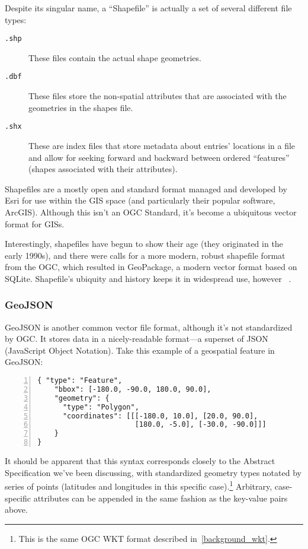 Despite its singular name, a ``Shapefile'' is actually a set of several different file types:

\begin{description}
  \item[\tt{.shp}] These files contain the actual shape geometries.
  \item[\tt{.dbf}] These files store the non-spatial attributes that are associated with the geometries in the shapes file.
  \item[\tt{.shx}] These are index files that store metadata about entries' locations in a file and allow for seeking forward and backward between ordered ``features'' (shapes associated with their attributes).
\end{description}

Shapefiles are a mostly open and standard format managed and developed by Esri for use within the GIS space (and particularly their popular software, ArcGIS). Although this isn't an OGC Standard, it's become a ubiquitous vector format for GISs.

Interestingly, shapefiles have begun to show their age (they originated in the early 1990s), and there were calls for a more modern, robust shapefile format from the OGC, which resulted in GeoPackage, a modern vector format based on SQLite. Shapefile's ubiquity and history keeps it in widespread use, however ~\cite{slashgeo,GeoPackage}.

\subsubsection{GeoJSON}
GeoJSON is another common vector file format, although it's not standardized by OGC. It stores data in a nicely-readable format---a superset of JSON (JavaScript Object Notation). Take this example of a geospatial feature in GeoJSON:

\begin{Verbatim}[samepage=true,baselinestretch=1,numbers=left,xleftmargin=12mm]
{ "type": "Feature",
    "bbox": [-180.0, -90.0, 180.0, 90.0],
    "geometry": {
      "type": "Polygon",
      "coordinates": [[[-180.0, 10.0], [20.0, 90.0],
                       [180.0, -5.0], [-30.0, -90.0]]]
    }
}
\end{Verbatim}

It should be apparent that this syntax corresponds closely to the Abstract Specification we've been discussing, with standardized geometry types notated by series of points (latitudes and longitudes in this specific case).\footnote{This is the same OGC WKT format described in~\ref{background_wkt}.} Arbitrary, case-specific attributes can be appended in the same fashion as the key-value pairs above.

